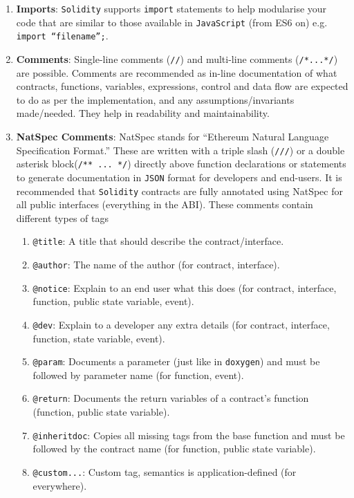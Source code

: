 \begin{enumerate}
\item\textbf{Imports}: \verb|Solidity| supports \verb|import| statements to help modularise your code that are similar to those available in \verb|JavaScript| (from ES6 on) e.g. \verb|import “filename”;|.

\item\textbf{Comments}: Single-line comments (\verb|//|) and multi-line comments (\verb|/*...*/|) are possible. Comments are recommended as in-line documentation of what contracts, functions, variables, expressions, control and data flow are expected to do as per the implementation, and any assumptions/invariants made/needed. They help in readability and maintainability.

\item\textbf{NatSpec Comments}: NatSpec stands for “Ethereum Natural Language Specification Format.” These are written with a triple slash (\verb|///|) or a double asterisk block(\verb|/** ... */|) directly above function declarations or statements to generate documentation in \verb|JSON| format for developers and end-users. It is recommended that \verb|Solidity| contracts are fully annotated using NatSpec for all public interfaces (everything in the ABI). These comments contain different types of tags
    \begin{enumerate}
    \item\verb|@title|: A title that should describe the contract/interface.
    \item\verb|@author|: The name of the author (for contract, interface).
    \item\verb|@notice|: Explain to an end user what this does (for contract, interface, function, public state variable, event).
    \item\verb|@dev|: Explain to a developer any extra details (for contract, interface, function, state variable, event).
    \item\verb|@param|: Documents a parameter (just like in \verb|doxygen|) and must be followed by parameter name (for function, event).
    \item\verb|@return|: Documents the return variables of a contract’s function (function, public state variable).
    \item\verb|@inheritdoc|: Copies all missing tags from the base function and must be followed by the contract name (for function, public state variable).
    \item\verb|@custom...|: Custom tag, semantics is application-defined (for everywhere).
    \end{enumerate}


\end{enumerate}
